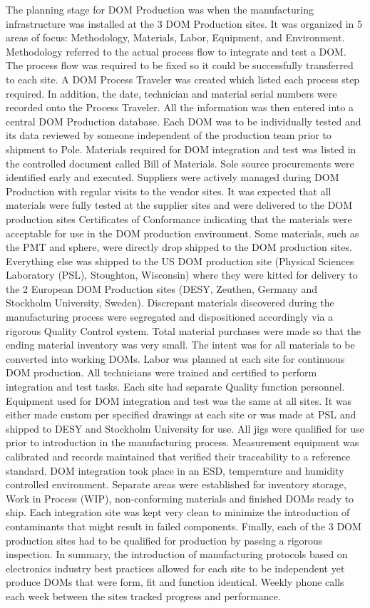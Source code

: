 The planning stage for DOM Production was when the manufacturing
infrastructure was installed at the 3 DOM Production sites. It was
organized in 5 areas of focus: Methodology, Materials, Labor, Equipment,
and Environment. Methodology referred to the actual process flow to
integrate and test a DOM. The process flow was required to be fixed so it
could be successfully transferred to each site. A DOM Process Traveler was
created which listed each process step required. In addition, the date,
technician and material serial numbers were recorded onto the Process
Traveler. All the information was then entered into a central DOM
Production database. Each DOM was to be individually tested and its data
reviewed by someone independent of the production team prior to shipment to
Pole. Materials required for DOM integration and test was listed in the
controlled document called Bill of Materials. Sole source procurements were
identified early and executed. Suppliers were actively managed during DOM
Production with regular visits to the vendor sites. It was expected that
all materials were fully tested at the supplier sites and were delivered to
the DOM production sites Certificates of Conformance indicating that the
materials were acceptable for use in the DOM production environment. Some
materials, such as the PMT and sphere, were directly drop shipped to the
DOM production sites. Everything else was shipped to the US DOM production
site (Physical Sciences Laboratory (PSL), Stoughton, Wisconsin) where they
were kitted for delivery to the 2 European DOM Production sites (DESY,
Zeuthen, Germany and Stockholm University, Sweden). Discrepant materials
discovered during the manufacturing process were segregated and
dispositioned accordingly via a rigorous Quality Control system. Total
material purchases were made so that the ending material inventory was very
small. The intent was for all materials to be converted into working
DOMs. Labor was planned at each site for continuous DOM production. All
technicians were trained and certified to perform integration and test
tasks. Each site had separate Quality function personnel. Equipment used
for DOM integration and test was the same at all sites. It was either made
custom per specified drawings at each site or was made at PSL and shipped
to DESY and Stockholm University for use. All jigs were qualified for use
prior to introduction in the manufacturing process. Measurement equipment
was calibrated and records maintained that verified their traceability to a
reference standard. DOM integration took place in an ESD, temperature and
humidity controlled environment. Separate areas were established for
inventory storage, Work in Process (WIP), non-conforming materials and
finished DOMs ready to ship. Each integration site was kept very clean to
minimize the introduction of contaminants that might result in failed
components. Finally, each of the 3 DOM production sites had to be qualified
for production by passing a rigorous inspection. In summary, the
introduction of manufacturing protocols based on electronics industry best
practices allowed for each site to be independent yet produce DOMs that
were form, fit and function identical. Weekly phone calls each week between
the sites tracked progress and performance. 

